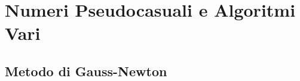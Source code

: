 \chapter{Numeri Pseudocasuali e Algoritmi Vari}\label{appendixC}
\section{Metodo di Gauss-Newton}\label{appendixC:gaussNewton}
